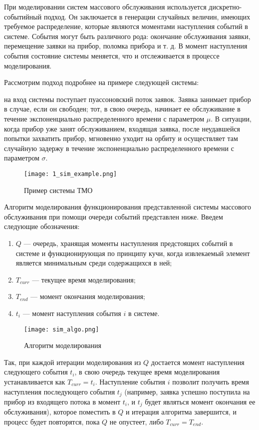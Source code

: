 При моделировании систем массового обслуживания используется дискретно-событийный подход. Он заключается в генерации случайных величин, имеющих требуемое распределение, которые являются моментами наступления событий в системе. События могут быть различного рода: окончание обслуживания заявки, перемещение заявки на прибор, поломка прибора и т. д. В момент наступления события состояние системы меняется, что и отслеживается в процессе моделирования.

Рассмотрим подход подробнее на примере следующей системы:

на вход системы поступает пуассоновский поток заявок. Заявка занимает прибор в случае, если он свободен; тот, в свою очередь, начинает ее обслуживание в течение экспоненциально распределенного времени с параметром $\mu$. В ситуации, когда прибор уже занят обслуживанием, входящая заявка, после неудавшейся попытки захватить прибор, мгновенно уходит на орбиту и осуществляет там случайную задержу в течение экспоненциально распределенного времени с параметром $\sigma$.

\begin{figure}[H]
	\centering
	\texttt{[image: 1\_sim\_example.png]}
	\caption{Пример системы ТМО}
	\label{sys_tmo_example}
\end{figure}

Алгоритм моделирования функционирования представленной системы массового обслуживания при помощи очереди событий представлен ниже.
Введем следующие обозначения:
\begin{enumerate}
	\item $Q$ --- очередь, хранящая моменты наступления предстоящих событий в системе и функционирующая по принципу кучи, когда извлекаемый элемент является минимальным среди содержащихся в ней;
	\item $T_{curr}$ --- текущее время моделирования;
	\item $T_{end}$ --- момент окончания моделирования;
	\item $t_i$ --- момент наступления события $i$ в системе. 
	\end{enumerate}

\begin{figure}[H]
	\centering
	\texttt{[image: sim\_algo.png]}
	\caption{Алгоритм моделирования}
	\label{sys_tmo_algo}
\end{figure}

Так, при каждой итерации моделирования из $Q$ достается момент наступления следующего события $t_i$, в свою очередь текущее время моделирования устанавливается как $T_{curr} = t_i$. Наступление события $i$ позволит получить время наступления последующего события $t_j$ (например, заявка успешно поступила на прибор из входящего потока в момент $t_i$, и $t_j$ будет являться момент окончания ее обслуживания), которое поместить в $Q$ и итерация алгоритма завершится, и процесс будет повторятся, пока $Q$ не опустеет, либо $T_{curr} = T_{end}$.

